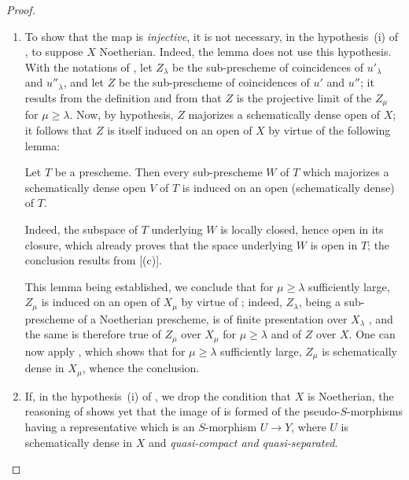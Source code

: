 \begin{proof}
\begin{remarks}[20.3.8.7]
\label{IV.20.3.8.7}
\begin{enumerate}[label=(\roman*)]
  \item To show that the map  is \emph{injective}, it is not necessary, in the hypothesis~(i) of , to suppose $X$ Noetherian.
  Indeed, the lemma  does not use this hypothesis.
  With the notations of , let $Z_\lambda$ be the sub-prescheme of coincidences of $u'_\lambda$ and $u''_\lambda$, and let $Z$ be the sub-prescheme of coincidences of $u'$ and $u''$;
  it results from the definition  and from  that $Z$ is the projective limit of the $Z_\mu$ for $\mu\geq\lambda$.
  Now, by hypothesis, $Z$ majorizes a schematically dense open of $X$;
  it follows that $Z$ is itself induced on an open of $X$ by virtue of the following lemma:

\begin{lemma}[20.3.8.8]
\label{IV.20.3.8.8}
Let $T$ be a prescheme.
Then every sub-prescheme $W$ of $T$ which majorizes a schematically dense open $V$ of $T$ is induced on an open (schematically dense) of $T$.
\end{lemma}

  Indeed, the subspace of $T$ underlying $W$ is locally closed, hence open
  in its closure, which already proves that the space underlying $W$ is open in $T$;
  the conclusion results from [(c)].

  This lemma being established, we conclude that for $\mu\geq\lambda$ sufficiently large, $Z_\mu$ is induced on an open of $X_\mu$ by virtue of ; indeed, $Z_\lambda$, being a sub-prescheme of a Noetherian prescheme, is of finite presentation over $X_\lambda$ , and the same is therefore true of $Z_\mu$ over $X_\mu$ for $\mu\geq\lambda$ and of $Z$ over $X$.
  One can now apply , which shows that for $\mu\geq\lambda$ sufficiently large, $Z_\mu$ is schematically dense in $X_\mu$, whence the conclusion.

  \item If, in the hypothesis~(i) of , we drop the condition that $X$ is Noetherian, the reasoning of  shows yet that the image of  is formed of the pseudo-$S$-morphisms having a representative which is an $S$-morphism $U\to Y$, where $U$ is schematically dense in $X$ and \emph{quasi-compact and quasi-separated}.
\end{enumerate}
\end{remarks}
\end{proof}

